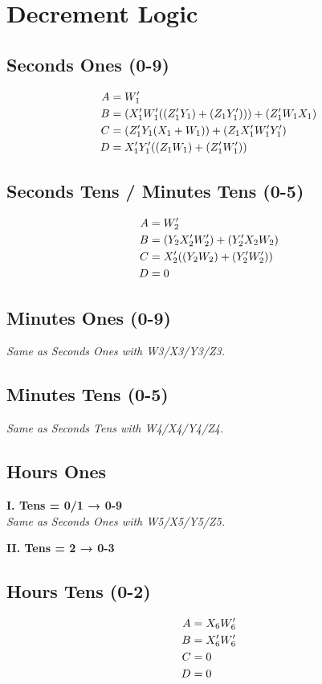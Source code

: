 \section{Decrement Logic}
\subsection{Seconds Ones (0-9)}


\begin{align}
A &= W_1' \notag\\
B &= (X_1' W_1' ((Z_1' Y_1) + (Z_1 Y_1'))) + (Z_1' W_1 X_1) \notag\\
C &= (Z_1' Y_1 (X_1 + W_1)) + (Z_1 X_1' W_1' Y_1') \notag\\
D &= X_1' Y_1' ((Z_1 W_1) + (Z_1' W_1')) \notag
\end{align}

\subsection{Seconds Tens / Minutes Tens (0-5)}


\begin{align}
A &= W_2' \notag\\
B &= (Y_2 X_2' W_2') + (Y_2' X_2 W_2) \notag\\
C &= X_2' ((Y_2 W_2) + (Y_2' W_2')) \notag\\
D &= 0 \notag
\end{align}

\subsection{Minutes Ones (0-9)}
\textit{Same as Seconds Ones with W3/X3/Y3/Z3.}

\subsection{Minutes Tens (0-5)}
\textit{Same as Seconds Tens with W4/X4/Y4/Z4.}

\subsection{Hours Ones}
\textbf{I. Tens = 0/1 → 0-9 }\\
\textit{Same as Seconds Ones with W5/X5/Y5/Z5.}

\textbf{II. Tens = 2 → 0-3}


\subsection{Hours Tens (0-2)}


\begin{align}
A &= X_6 W_6' \notag\\
B &= X_6' W_6' \notag\\
C &= 0 \notag\\
D &= 0 \notag
\end{align}

